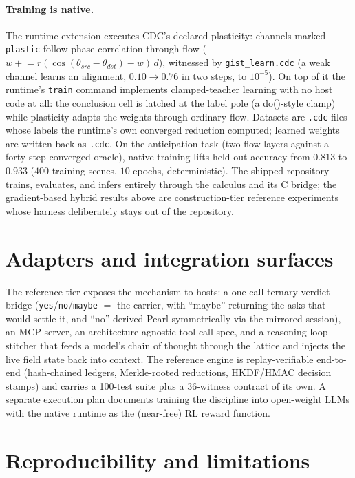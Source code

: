 \documentclass[11pt]{article}
\begin{document}
\paragraph{Training is native.} The runtime extension executes CDC's
declared plasticity: channels marked \texttt{plastic} follow phase
correlation through flow ($w\mathrel{+}=r(\cos(\theta_{src}{-}
\theta_{dst})-w)\,d$), witnessed by \texttt{gist\_learn.cdc} (a weak
channel learns an alignment, $0.10\to0.76$ in two steps, to $10^{-5}$).
On top of it the runtime's \texttt{train} command implements
clamped-teacher learning with no host code at all: the conclusion cell is
latched at the label pole (a do()-style clamp) while plasticity adapts the
weights through ordinary flow. Datasets are \texttt{.cdc} files whose
labels the runtime's own converged reduction computed; learned weights are
written back as \texttt{.cdc}. On the anticipation task (two flow layers
against a forty-step converged oracle), native training lifts held-out
accuracy from $0.813$ to $\mathbf{0.933}$ ($400$ training scenes, $10$
epochs, deterministic). The shipped repository trains, evaluates, and
infers entirely through the calculus and its C bridge; the gradient-based
hybrid results above are construction-tier reference experiments whose
harness deliberately stays out of the repository.

\section{Adapters and integration surfaces}

The reference tier exposes the mechanism to hosts: a one-call ternary
verdict bridge (\texttt{yes}/\texttt{no}/\texttt{maybe} $=$ the carrier,
with ``maybe'' returning the asks that would settle it, and ``no''
derived Pearl-symmetrically via the mirrored session), an MCP server, an
architecture-agnostic tool-call spec, and a reasoning-loop stitcher that
feeds a model's chain of thought through the lattice and injects the live
field state back into context. The reference engine is replay-verifiable
end-to-end (hash-chained ledgers, Merkle-rooted reductions, HKDF/HMAC
decision stamps) and carries a 100-test suite plus a 36-witness contract
of its own. A separate execution plan documents training the discipline
into open-weight LLMs with the native runtime as the (near-free) RL
reward function.

\section{Reproducibility and limitations}
\end{document}
